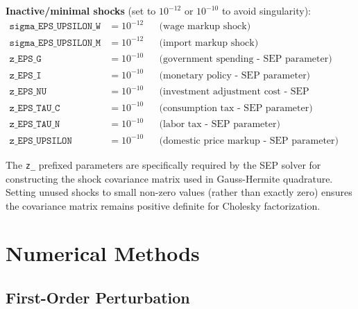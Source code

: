 \documentclass[12pt]{article}
\begin{document}
\textbf{Inactive/minimal shocks} (set to $10^{-12}$ or $10^{-10}$ to avoid singularity):
\begin{align*}
\texttt{sigma\_EPS\_UPSILON\_W} &= 10^{-12} & &\text{(wage markup shock)} \\
\texttt{sigma\_EPS\_UPSILON\_M} &= 10^{-12} & &\text{(import markup shock)} \\
\texttt{z\_EPS\_G} &= 10^{-10} & &\text{(government spending - SEP parameter)} \\
\texttt{z\_EPS\_I} &= 10^{-10} & &\text{(monetary policy - SEP parameter)} \\
\texttt{z\_EPS\_NU} &= 10^{-10} & &\text{(investment adjustment cost - SEP parameter)} \\
\texttt{z\_EPS\_TAU\_C} &= 10^{-10} & &\text{(consumption tax - SEP parameter)} \\
\texttt{z\_EPS\_TAU\_N} &= 10^{-10} & &\text{(labor tax - SEP parameter)} \\
\texttt{z\_EPS\_UPSILON} &= 10^{-10} & &\text{(domestic price markup - SEP parameter)}
\end{align*}

The \texttt{z\_} prefixed parameters are specifically required by the SEP solver for constructing the shock covariance matrix used in Gauss-Hermite quadrature. Setting unused shocks to small non-zero values (rather than exactly zero) ensures the covariance matrix remains positive definite for Cholesky factorization.

\section{Numerical Methods}\label{sec:numerical}

\subsection{First-Order Perturbation}
\end{document}
